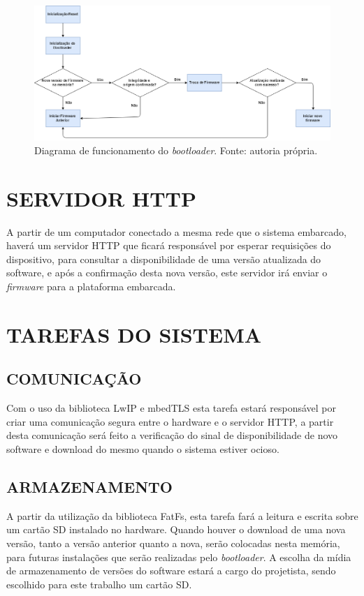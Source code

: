 \begin{figure}[H]
    \scriptsize
     \centering
     \includegraphics[scale=0.43]{dados/figuras/DiagramaBootloader.png}
     \caption{Diagrama de funcionamento do \textit{bootloader}. Fonte: autoria própria.}
     \label{Diagrama Bootloader}
\end{figure}

\section{SERVIDOR HTTP}
\label{sec:ServidorHTTP}

A partir de um computador conectado a mesma rede que o sistema embarcado, haverá um servidor HTTP que ficará responsável por esperar requisições do dispositivo, para consultar a disponibilidade de uma versão atualizada do software, e após a confirmação desta nova versão, este servidor irá enviar o \textit{firmware} para a plataforma embarcada.

\section{TAREFAS DO SISTEMA}
\label{sec:Tarefassistema}

\subsection{COMUNICAÇÃO}

Com o uso da biblioteca LwIP e mbedTLS esta tarefa estará responsável por criar uma comunicação segura entre o hardware e o servidor HTTP, a partir desta comunicação será feito a verificação do sinal de disponibilidade de novo software e download do mesmo quando o sistema estiver ocioso. 

\subsection{ARMAZENAMENTO}

A partir da utilização da biblioteca FatFs, esta tarefa fará a leitura e escrita sobre um cartão SD instalado no hardware. Quando houver o download de uma nova versão, tanto a versão anterior quanto a nova, serão colocadas nesta memória, para futuras instalações que serão realizadas pelo \textit{bootloader}. A escolha da mídia de armazenamento de versões do software estará a cargo do projetista, sendo escolhido para este trabalho um cartão SD.


